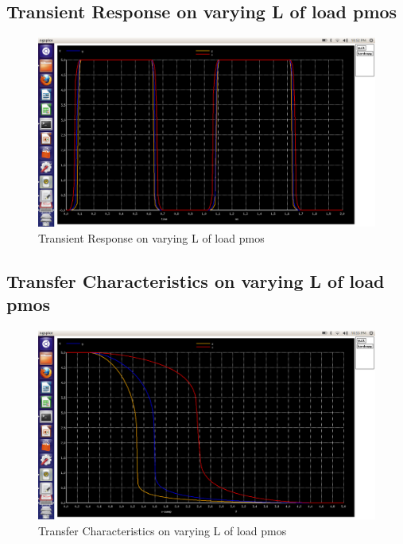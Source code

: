\documentclass[12pt,a4paper]{article}
\begin{document}
\begin{center}
 \subsection{Transient Response on varying L of load pmos}
 \begin{figure}[!ht]
 \centering
 \includegraphics[scale=0.34]{lab5_4_pic1_transient_varing_Lof_loadpmos.png}
 \caption[Short]{Transient Response on varying L of load pmos}
 \end{figure}
 
 \subsection{Transfer Characteristics on varying L of load pmos}
 \begin{figure}[!ht]
 \centering
 \includegraphics[scale=0.34]{lab5_4_pic2_transfer_char_varing_Lof_loadpmos.png}
 \caption[Short]{Transfer Characteristics on varying L of load pmos}
 \end{figure}
 \clearpage
 

\end{center}
\end{document}

